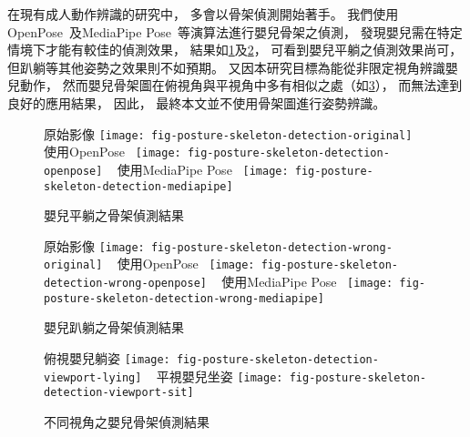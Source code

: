 \documentclass[class=NCU_thesis, crop=false]{standalone}
\begin{document}
在現有成人動作辨識的研究中，
多會以骨架偵測開始著手。
我們使用OpenPose~\cite{cao_openpose_2019}及MediaPipe Pose~\cite{noauthor_pose_nodate}等演算法進行嬰兒骨架之偵測，
發現嬰兒需在特定情境下才能有較佳的偵測效果，
結果如\cref{fig:fig-posture-skeleton-detection}及\cref{fig:fig-posture-skeleton-detection-wrong}，
可看到嬰兒平躺之偵測效果尚可，
但趴躺等其他姿勢之效果則不如預期。
又因本研究目標為能從非限定視角辨識嬰兒動作，
然而嬰兒骨架圖在俯視角與平視角中多有相似之處（如\cref{fig:fig-posture-skeleton-detection-viewport}），
而無法達到良好的應用結果，
因此，
最終本文並不使用骨架圖進行姿勢辨識。
\begin{figure}[!hbt]
    \centering
    \subcaptionbox
        {原始影像
        \label{fig:fig-posture-skeleton-detection-original}}
        {\texttt{[image: fig-posture-skeleton-detection-original]}}
    ~
    \subcaptionbox
        {使用OpenPose~\cite{cao_openpose_2019}
        \label{fig:fig-posture-skeleton-detection-openpose}}
        {\texttt{[image: fig-posture-skeleton-detection-openpose]}}
    ~
    \subcaptionbox
        {使用MediaPipe Pose~\cite{noauthor_pose_nodate}
        \label{fig:fig-posture-skeleton-detection-mediapipe}}
        {\texttt{[image: fig-posture-skeleton-detection-mediapipe]}}
    \caption{嬰兒平躺之骨架偵測結果}
    \label{fig:fig-posture-skeleton-detection}
\end{figure}
\begin{figure}[!hbt]
    \centering
    \subcaptionbox
        {原始影像
        \label{fig:fig-posture-skeleton-detection-wrong-original}}
        {\texttt{[image: fig-posture-skeleton-detection-wrong-original]}}
    ~
    \subcaptionbox
        {使用OpenPose~\cite{cao_openpose_2019}
        \label{fig:fig-posture-skeleton-detection-wrong-openpose}}
        {\texttt{[image: fig-posture-skeleton-detection-wrong-openpose]}}
    ~
    \subcaptionbox
        {使用MediaPipe Pose~\cite{noauthor_pose_nodate}
        \label{fig:fig-posture-skeleton-detection-wrong-mediapipe}}
        {\texttt{[image: fig-posture-skeleton-detection-wrong-mediapipe]}}
    \caption{嬰兒趴躺之骨架偵測結果}
    \label{fig:fig-posture-skeleton-detection-wrong}
\end{figure}
\begin{figure}[!hbt]
    \centering
    \subcaptionbox
        {俯視嬰兒躺姿
        \label{fig:fig-posture-skeleton-detection-viewport-lying}}
        {\texttt{[image: fig-posture-skeleton-detection-viewport-lying]}}
    ~
    \subcaptionbox
        {平視嬰兒坐姿
        \label{fig:fig-posture-skeleton-detection-viewport-sit}}
        {\texttt{[image: fig-posture-skeleton-detection-viewport-sit]}}
    \caption{不同視角之嬰兒骨架偵測結果}
    \label{fig:fig-posture-skeleton-detection-viewport}
\end{figure}
\end{document}
